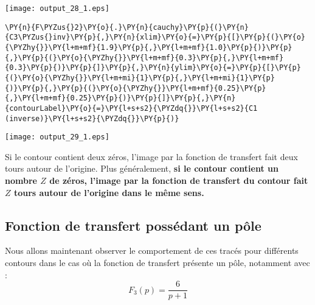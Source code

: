\begin{center}
    \texttt{[image: output\_28\_1.eps]}
\end{center}
\begin{tcolorbox}[breakable, size=fbox, boxrule=1pt, pad at break*=1mm,colback=cellbackground, colframe=cellborder]
\begin{Verbatim}[commandchars=\\\{\}]
\PY{n}{F\PYZus{}2}\PY{o}{.}\PY{n}{cauchy}\PY{p}{(}\PY{n}{C3\PYZus{}inv}\PY{p}{,}\PY{n}{xlim}\PY{o}{=}\PY{p}{[}\PY{p}{(}\PY{o}{\PYZhy{}}\PY{l+m+mf}{1.9}\PY{p}{,}\PY{l+m+mf}{1.0}\PY{p}{)}\PY{p}{,}\PY{p}{(}\PY{o}{\PYZhy{}}\PY{l+m+mf}{0.3}\PY{p}{,}\PY{l+m+mf}{0.3}\PY{p}{)}\PY{p}{]}\PY{p}{,}\PY{n}{ylim}\PY{o}{=}\PY{p}{[}\PY{p}{(}\PY{o}{\PYZhy{}}\PY{l+m+mi}{1}\PY{p}{,}\PY{l+m+mi}{1}\PY{p}{)}\PY{p}{,}\PY{p}{(}\PY{o}{\PYZhy{}}\PY{l+m+mf}{0.25}\PY{p}{,}\PY{l+m+mf}{0.25}\PY{p}{)}\PY{p}{]}\PY{p}{,}\PY{n}{contourLabel}\PY{o}{=}\PY{l+s+s2}{\PYZdq{}}\PY{l+s+s2}{C1 (inverse)}\PY{l+s+s2}{\PYZdq{}}\PY{p}{)}
\end{Verbatim}
\end{tcolorbox}
\begin{center}
    \texttt{[image: output\_29\_1.eps]}
\end{center}
Si le contour contient deux zéros, l'image par la fonction de transfert
fait deux tours autour de l'origine. Plus généralement, \textbf{si le
contour contient un nombre \(Z\) de zéros, l'image par la fonction de
transfert du contour fait \(Z\) tours autour de l'origine dans le même
sens.} 
\subsection{Fonction de transfert possédant un pôle}
Nous allons maintenant observer le comportement de ces tracés pour différents
contours dans le cas où la fonction de transfert présente un pôle,
notamment avec :
\[
F_3(p)=\dfrac{6}{p+1}
\] 
